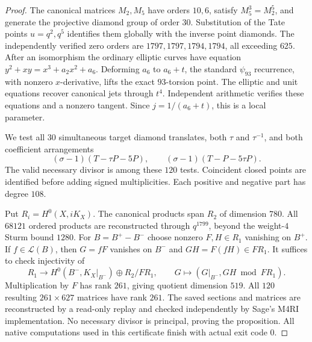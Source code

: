 \begin{proof}
The canonical matrices $M_2,M_5$ have orders $10,6$, satisfy
$M_5^3=M_2^5$, and generate the projective diamond group of order $30$.
Substitution of the Tate points $u=q^2,q^5$ identifies them globally
with the inverse point diamonds. The independently verified zero
orders are $1797,1797,1794,1794$, all exceeding $625$.
After an isomorphism the ordinary elliptic curves have equation
$y^2+xy=x^3+a_2x^2+a_6$. Deforming $a_6$ to $a_6+t$, the standard
$\psi_{93}$ recurrence, with nonzero $x$-derivative, lifts the exact
$93$-torsion point. The elliptic and unit equations recover canonical
jets through $t^4$. Independent arithmetic verifies these equations
and a nonzero tangent. Since $j=1/(a_6+t)$, this is a local parameter.

We test all $30$ simultaneous target diamond translates, both $\tau$
and $\tau^{-1}$, and both coefficient arrangements
\[
 (\sigma-1)(T-\tau P-5P),\qquad
 (\sigma-1)(T-P-5\tau P).
\]
The valid necessary divisor is among these $120$ tests. Coincident
closed points are identified before adding signed multiplicities.
Each positive and negative part has degree $108$.

Put $R_i=H^0(X,iK_X)$. The canonical products span $R_2$ of dimension
$780$. All $68121$ ordered products are reconstructed through
$q^{1799}$, beyond the weight-$4$ Sturm bound $1280$.
For $B=B^+-B^-$ choose nonzero $F,H\in R_1$ vanishing on $B^+$.
If $f\in\mathcal L(B)$, then $G=fF$ vanishes on $B^-$ and
$GH=F(fH)\in FR_1$. It suffices to check injectivity of
\[
 R_1\longrightarrow H^0(B^-,K_X|_{B^-})\oplus R_2/FR_1,
 \qquad G\longmapsto(G|_{B^-},GH\bmod FR_1).
\]
Multiplication by $F$ has rank $261$, giving quotient dimension $519$.
All $120$ resulting $261\times627$ matrices have rank $261$.
The saved sections and matrices are reconstructed by a read-only
replay and checked independently by Sage's M4RI implementation.
No necessary divisor is principal, proving the proposition.
All native computations used in this certificate finish with actual
exit code $0$.
\end{proof}
